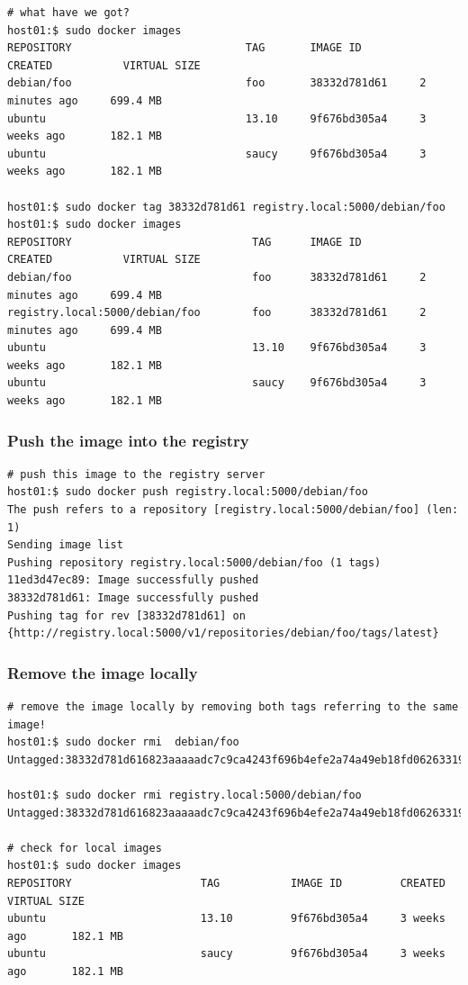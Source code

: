 \documentclass[11pt]{article}
\begin{document}
\begin{verbatim}
# what have we got?
host01:$ sudo docker images
REPOSITORY                           TAG       IMAGE ID         CREATED           VIRTUAL SIZE
debian/foo                           foo       38332d781d61     2 minutes ago     699.4 MB
ubuntu                               13.10     9f676bd305a4     3 weeks ago       182.1 MB
ubuntu                               saucy     9f676bd305a4     3 weeks ago       182.1 MB

host01:$ sudo docker tag 38332d781d61 registry.local:5000/debian/foo
host01:$ sudo docker images 
REPOSITORY                            TAG      IMAGE ID         CREATED           VIRTUAL SIZE
debian/foo                            foo      38332d781d61     2 minutes ago     699.4 MB
registry.local:5000/debian/foo        foo      38332d781d61     2 minutes ago     699.4 MB
ubuntu                                13.10    9f676bd305a4     3 weeks ago       182.1 MB
ubuntu                                saucy    9f676bd305a4     3 weeks ago       182.1 MB
\end{verbatim}
\subsubsection{Push the image into the registry}
\label{sec-3-7-2}


\begin{verbatim}
# push this image to the registry server
host01:$ sudo docker push registry.local:5000/debian/foo
The push refers to a repository [registry.local:5000/debian/foo] (len: 1)
Sending image list
Pushing repository registry.local:5000/debian/foo (1 tags)
11ed3d47ec89: Image successfully pushed 
38332d781d61: Image successfully pushed 
Pushing tag for rev [38332d781d61] on {http://registry.local:5000/v1/repositories/debian/foo/tags/latest}
\end{verbatim}
\subsubsection{Remove the image locally}
\label{sec-3-7-3}


\begin{verbatim}
# remove the image locally by removing both tags referring to the same image!
host01:$ sudo docker rmi  debian/foo
Untagged:38332d781d616823aaaaadc7c9ca4243f696b4efe2a74a49eb18fd062633198d

host01:$ sudo docker rmi registry.local:5000/debian/foo
Untagged:38332d781d616823aaaaadc7c9ca4243f696b4efe2a74a49eb18fd062633198d

# check for local images
host01:$ sudo docker images
REPOSITORY                    TAG           IMAGE ID         CREATED           VIRTUAL SIZE
ubuntu                        13.10         9f676bd305a4     3 weeks ago       182.1 MB
ubuntu                        saucy         9f676bd305a4     3 weeks ago       182.1 MB
\end{verbatim}
\end{document}
